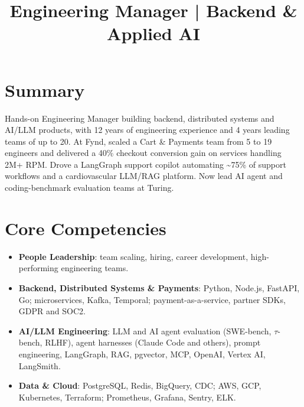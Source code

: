 \documentclass[11pt,a4paper,sans]{moderncv}
\begin{document}
\title{Engineering Manager | Backend \& Applied AI}
\makecvtitle
\vspace{-1.6\baselineskip} %


\section{Summary}
\vspace{1pt}
{Hands-on Engineering Manager building backend, distributed systems and AI/LLM products, with 12 years of engineering experience and 4 years leading teams of up to 20. At Fynd, scaled a Cart \& Payments team from 5 to 19 engineers and delivered a 40\% checkout conversion gain on services handling 2M+ RPM. Drove a LangGraph support copilot automating \textasciitilde{}75\% of support workflows and a cardiovascular LLM/RAG platform. Now lead AI agent and coding-benchmark evaluation teams at Turing.}


\section{Core Competencies}
\vspace{1pt}
\begin{itemize}

\item \textbf{People Leadership}: team scaling, hiring, career development, high-performing engineering teams.

\item \textbf{Backend, Distributed Systems \& Payments}: Python, Node.js, FastAPI, Go; microservices, Kafka, Temporal; payment-as-a-service, partner SDKs, GDPR and SOC2.

\item \textbf{AI/LLM Engineering}: LLM and AI agent evaluation (SWE-bench, $\tau$-bench, RLHF), agent harnesses (Claude Code and others), prompt engineering, LangGraph, RAG, pgvector, MCP, OpenAI, Vertex AI, LangSmith.

\item \textbf{Data \& Cloud}: PostgreSQL, Redis, BigQuery, CDC; AWS, GCP, Kubernetes, Terraform; Prometheus, Grafana, Sentry, ELK.

\end{itemize}
\end{document}
